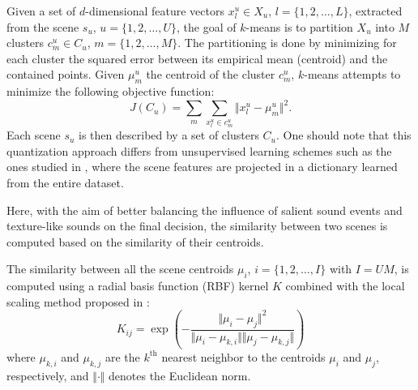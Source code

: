 \documentclass[journal]{IEEEtran}
\newcommand{\ja}[1]{\textcolor{magenta}{Joakim : #1}}
\begin{document}
Given a set of $d$-dimensional feature vectors $x_l^u\in X_u$, $l=\lbrace 1,2,\ldots,L\rbrace$, extracted from the scene $s_u$, $u=\lbrace 1,2,\ldots,U\rbrace$, the goal of $k$-means is to partition $X_u$ into $M$ clusters $c^u_m\in C_u$, $m=\lbrace 1,2,\ldots,M\rbrace$. The partitioning is done by minimizing for each cluster the squared error between its empirical mean (centroid) and the contained points. Given $\mu_m^u$ the centroid of the cluster $c_m^u$, $k$-means attempts to minimize the following objective function:
\begin{equation}
J(C_u)=\sum\limits_{m} \sum_{x^u_l\in c^u_m} \Vert x_l^u - \mu_m^u \Vert^2\mbox{.}
\end{equation}
Each scene $s_u$ is then described by a set of clusters $C_u$. One should note that this quantization approach differs from unsupervised learning schemes such as the ones studied in \cite{bisot2016acoustic}, where the scene features are projected in a dictionary learned from the entire dataset.


Here, with the aim of better balancing the influence of salient sound events and texture-like sounds on the final decision, the similarity between two scenes is computed based on the similarity of their centroids.

The similarity between all the scene centroids $\mu_i$, $i=\lbrace1,2,\ldots,I \rbrace$ with $I=UM$, is computed using a radial basis function (RBF) kernel $K$ combined with the local scaling method proposed in \cite{selfTuneManor2004}:
\begin{equation}
\label{eq:kc}
K_{ij} = \exp\left( - \dfrac{\Vert \mu_i - \mu_j \Vert^2}{\Vert \mu_i - \mu_{k,i} \Vert \Vert \mu_j - \mu_{k,j} \Vert} \right) 
\end{equation} 
where $\mu_{k,i}$ and $\mu_{k,j}$ are the $k^{\textrm{th}}$ nearest neighbor to the centroids $\mu_i$ and $\mu_j$, respectively, and $\Vert \cdot \Vert$ denotes the Euclidean norm.
\end{document}
